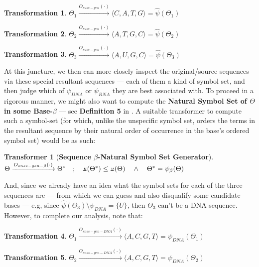 \documentclass[a4paper, 18pt]{book} %
\newtheorem{trans}{Transformation}
\newtheorem{transf}{Transformer}
\newcommand{\invpi}{\rotatebox[origin=c]{180}{$\pi$}}
\begin{document}
\begin{trans}
$\Theta_1 \xrightarrow{O_{suss-gen}(\cdot)} \langle C, A, T, G \rangle = \hat{\psi}(\Theta_1)$
\end{trans}

\begin{trans}
$\Theta_2 \xrightarrow{O_{suss-gen}(\cdot)} \langle A, T, G, C \rangle = \hat{\psi}(\Theta_2)$
\end{trans}

\begin{trans}
$\Theta_3 \xrightarrow{O_{suss-gen}(\cdot)} \langle A, U, G, C \rangle = \hat{\psi}(\Theta_3)$\\
\end{trans}

At this juncture, we then can more closely inspect the original/source sequences via these special resultant sequences --- each of them a kind of symbol set, and then judge which of $\psi_{DNA}$ or $\psi_{RNA}$ they are best associated with. To proceed in a rigorous manner, we might also want to compute the \textbf{Natural Symbol Set of $\Theta$ in some Base-$\beta$} --- see \textbf{Definition 5} in \cite{ossipaper}. A suitable transformer to compute such a symbol-set (for which, unlike the unspecific symbol set, orders the terms in the resultant sequence by their natural order of occurrence in the base's ordered symbol set) would be as such:\\


\begin{transf}[\textbf{Sequence $\beta$-Natural Symbol Set Generator}]
\label{TRANSNSGEN}$ $\\
$\Theta \xrightarrow{O_{snss-gen-\beta}(\cdot)} \Theta^* \quad;\quad \invpi(\Theta^*) \leq \invpi(\Theta) \quad \land \quad \Theta^* = \psi_\beta(\Theta)$\\
\end{transf}

And, since we already have an idea what the symbol sets for each of the three sequences are --- from which we can guess and also disqualify some candidate bases --- e.g, since $\hat{\psi}(\Theta_3) \setminus \psi_{DNA} = \{U\}$, then $\Theta_3$ can't be a DNA sequence. However, to complete our analysis, note that:


\begin{trans}
$\Theta_1 \xrightarrow{O_{snss-gen-DNA}(\cdot)} \langle A, C, G, T \rangle = \psi_{DNA}(\Theta_1)$
\end{trans}

\begin{trans}
$\Theta_2 \xrightarrow{O_{snss-gen-DNA}(\cdot)} \langle A, C, G, T \rangle = \psi_{DNA}(\Theta_2)$
\end{trans}
\end{document}
